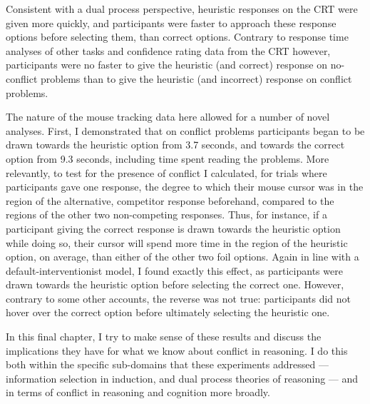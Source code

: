 Consistent with a dual process perspective,
heuristic responses on the CRT were given more quickly,
and participants were faster to approach these response options before selecting them,
than correct options.
Contrary to response time analyses of other tasks \citep[e.g.][]{DeNeys2008}
and confidence rating data from the CRT \citep{DeNeys2013a,Gangemi2015} however,
participants were no faster to give
the heuristic (and correct) response on no-conflict problems
than to give the heuristic (and incorrect) response on conflict problems.

The nature of the mouse tracking data here allowed for a number of novel analyses.
First, I demonstrated that on conflict problems
participants began to be drawn towards the heuristic option from 3.7 seconds,
and towards the correct option from 9.3 seconds,
including time spent reading the problems.
More relevantly, to test for the presence of conflict
I calculated, for trials where participants gave one response,
the degree to which their mouse cursor was in the region of
the alternative, competitor response beforehand,
compared to the regions of the other two non-competing responses.
Thus, for instance, if a participant giving the correct response
is drawn towards the heuristic option while doing so,
their cursor will spend more time in the region of the heuristic option,
on average, than either of the other two foil options.
Again in line with a default-interventionist model,
I found exactly this effect,
as participants were drawn towards the heuristic option
before selecting the correct one.
However, contrary to some other accounts, the reverse was not true:
participants did not hover over the correct option
before ultimately selecting the heuristic one.

In this final chapter,
I try to make sense of these results
and discuss the implications they have for what we know about conflict in reasoning.
I do this both within the specific sub-domains
that these experiments addressed ---
information selection in induction,
and dual process theories of reasoning ---
and in terms of conflict in reasoning and cognition more broadly.
